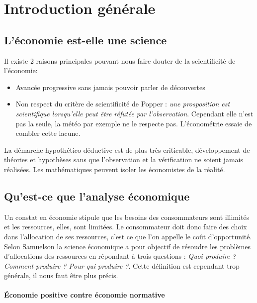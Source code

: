 \section{Introduction générale} %
\label{prt:introduction_generale}

\subsection{L'économie est-elle une science} %
\label{sec:l_economie_est_elle_une_science}
Il existe 2 raisons principales pouvant nous faire douter de la scientificité de l'économie:

\begin{itemize}[label=]
	\item Avancée progressive sans jamais pouvoir parler de découvertes	
	\item Non respect du critère de scientificité de Popper : \emph{une prosposition est scientifique lorsqu'elle peut être réfutée par l'observation}. Cependant elle n'est pas la seule, la météo par exemple ne le respecte pas. L'économétrie essaie de combler cette lacune.
\end{itemize}

La démarche hypothético-déductive est de plus très criticable, développement de théories et hypothèses sans que l'observation et la vérification ne soient jamais réalisées. Les mathématiques peuvent isoler les économistes de la réalité.


\subsection{Qu'est-ce que l'analyse économique} %
\label{sec:qu_est_ce_que_l_analyse_economique}

Un constat en économie stipule que les besoins des consommateurs sont illimités et les ressources, elles, sont limitées. Le consommateur doit donc faire des choix dans l'allocation de ses ressources, c'est ce que l'on appelle le coût d'opportunité. Selon Samuelson la science économique a pour objectif de résoudre les problèmes d'allocations des ressources en répondant à trois questions : \emph{Quoi produire ? Comment produire ? Pour qui produire ?}. Cette définition est cependant trop générale, il nous faut être plus précis. 

\paragraph{Économie positive contre économie normative} %
\label{par:economie_positive_contre_economie_normative}


